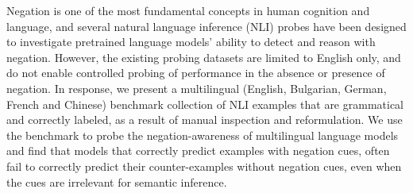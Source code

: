 Negation is one of the most fundamental concepts in human cognition and language, and several natural language inference (NLI) probes have been designed to investigate pretrained language models' ability to detect and reason with negation. However, the existing probing datasets are limited to English only, and do not enable controlled probing of performance in the absence or presence of negation. In response, we present a multilingual (English, Bulgarian, German, French and Chinese) benchmark collection of NLI examples that are grammatical and correctly labeled, as a result of manual inspection and reformulation. We use the benchmark to probe the negation-awareness of multilingual language models and find that models that correctly predict examples with negation cues, often fail to correctly predict their counter-examples without negation cues, even when the cues are irrelevant for semantic inference.
